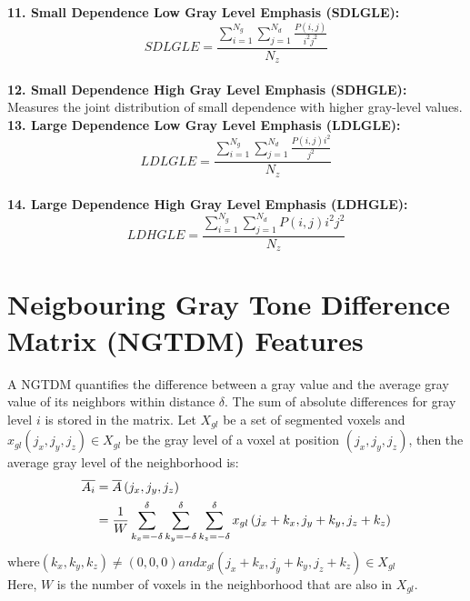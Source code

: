 \textbf{11. Small Dependence Low Gray Level Emphasis (SDLGLE):}\\
\[\textit{SDLGLE}=\frac{\sum _{i=1}^{N_{g}}\sum _{j=1}^{N_{d}}\frac{P\left(i,j\right)}{i^{2}j^{2}}}{N_{z}}\]\\
\textbf{12. Small Dependence High Gray Level Emphasis (SDHGLE):}\\
Measures the joint distribution of small dependence with higher gray-level values.\\
\textbf{13. Large Dependence Low Gray Level Emphasis (LDLGLE):}\\
\[\textit{LDLGLE}=\frac{\sum _{i=1}^{N_{g}}\sum _{j=1}^{N_{d}}\frac{P\left(i,j\right)i^{2}}{j^{2}}}{N_{z}}\]\\
\textbf{14. Large Dependence High Gray Level Emphasis (LDHGLE):}\\
\[\textit{LDHGLE}=\frac{\sum _{i=1}^{N_{g}}\sum _{j=1}^{N_{d}}P\left(i,j\right)i^{2}j^{2}}{N_{z}}\]


\section{Neigbouring Gray Tone Difference Matrix (NGTDM) Features}


A NGTDM quantifies the difference between a gray value and the average gray value of its neighbors within distance $\delta $. The sum of absolute differences for gray level $i$ is stored in the matrix. Let $X_{gl}$ be a set of segmented voxels and $x_{gl}\left(j_{x},j_{y},j_{z}\right)\in X_{gl}$ be the gray level of a voxel at position $\left(j_{x},j_{y},j_{z}\right)$, then the average gray level of the neighborhood is:\\
\begin{align}
\overline{A_{i}} & =\overline{A}\left(j_{x},j_{y},j_{z}\right) \\
& = \frac{1}{W}\sum _{k_{x}=-\delta }^{\delta }\sum _{k_{y}=-\delta }^{\delta }\sum _{k_{z}=-\delta}^{\delta}x_{gl}\left(j_{x}+k_{x},j_{y}+k_{y},j_{z}+k_{z}\right) \\
\end{align}
$\text{where} \left(k_{x},k_{y},k_{z}\right)\neq \left(0,0,0\right) and x_{gl}\left(j_{x}+k_{x},j_{y}+k_{y},j_{z}+k_{z}\right)\in X_{gl}$\\
Here, $W$ is the number of voxels in the neighborhood that are also in $X_{gl}$.\\


